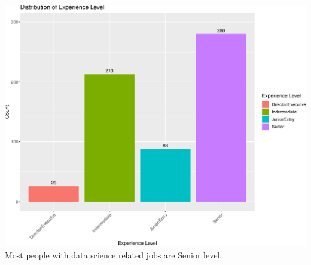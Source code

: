 \documentclass[
]{article}
\begin{document}
\includegraphics{Susman_RProject_files/figure-latex/Analysis-1.pdf} Most
people with data science related jobs are Senior level.
\end{document}
